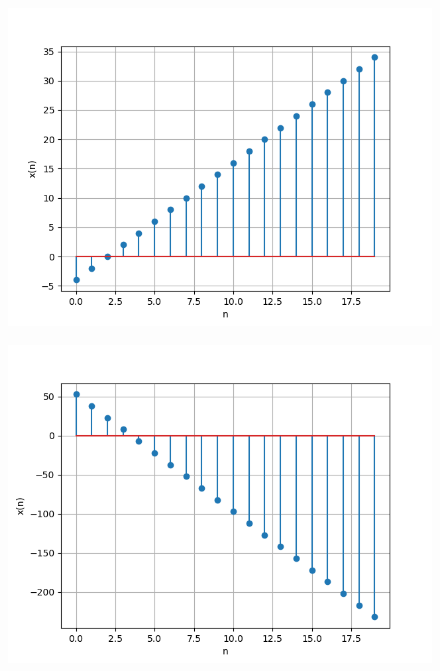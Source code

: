 \documentclass[journal,12pt,twocolumn]{IEEEtran}
\theoremstyle{remark}
\begin{document}
\begin{figure}[h] 
      \centering
       \includegraphics[width=1\linewidth]{figs/plot4.png} %
        \caption{}
    \end{figure}
    
\begin{figure}[h]
      \centering
       \includegraphics[width=1\linewidth]{figs/plot5.png} %
        \caption{}
\end{figure}
\end{document}
